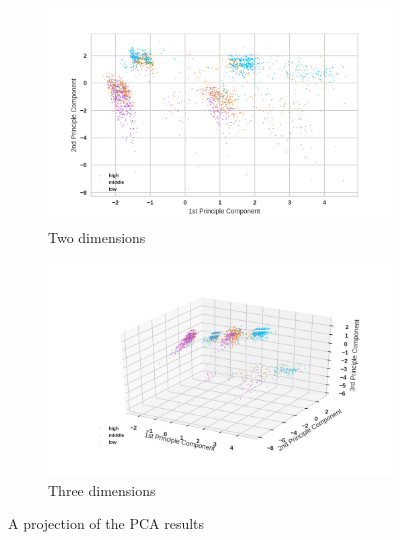 \documentclass[12pt]{article}
\begin{document}
\begin{figure}
    \centering
    \begin{subfigure}[b]{0.48\textwidth}
        \includegraphics[width=\textwidth]{images/pca1-2d.png}
        \caption{Two dimensions}
        \label{fig:pca1-2d}
    \end{subfigure}
    \begin{subfigure}[b]{0.48\textwidth}
        \includegraphics[width=\textwidth]{images/pca1-3d.png}
        \caption{Three dimensions}
        \label{fig:pca1-3d}
    \end{subfigure}
    \caption{A projection of the PCA results}
\end{figure}
\end{document}
